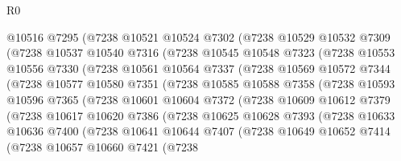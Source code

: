 \begin{lexlean}{R0}
\begin{coremodule}
          @10516
          @7295
          (@7238
            @10521
            @10524
            @7302
            (@7238
              @10529
              @10532
              @7309
              (@7238
                @10537
                @10540
                @7316
                (@7238
                  @10545
                  @10548
                  @7323
                  (@7238
                    @10553
                    @10556
                    @7330
                    (@7238
                      @10561
                      @10564
                      @7337
                      (@7238
                        @10569
                        @10572
                        @7344
                        (@7238
                          @10577
                          @10580
                          @7351
                          (@7238
                            @10585
                            @10588
                            @7358
                            (@7238
                              @10593
                              @10596
                              @7365
                              (@7238
                                @10601
                                @10604
                                @7372
                                (@7238
                                  @10609
                                  @10612
                                  @7379
                                  (@7238
                                    @10617
                                    @10620
                                    @7386
                                    (@7238
                                      @10625
                                      @10628
                                      @7393
                                      (@7238
                                        @10633
                                        @10636
                                        @7400
                                        (@7238
                                          @10641
                                          @10644
                                          @7407
                                          (@7238
                                            @10649
                                            @10652
                                            @7414
                                            (@7238
                                              @10657
                                              @10660
                                              @7421
                                              (@7238

\end{coremodule}
\end{lexlean}

